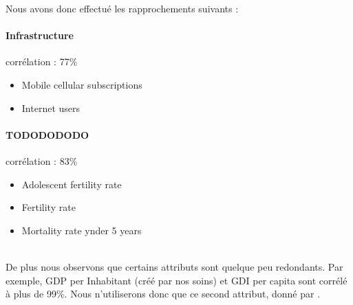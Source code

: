 Nous avons donc effectué les rapprochements suivants : 
\paragraph{Infrastructure} corrélation : 77\%
		\begin{itemize}
			\item Mobile cellular subscriptions
			\item Internet users
		\end{itemize}
\paragraph{TODODODODO} corrélation : 83\%
		\begin{itemize}
			\item Adolescent fertility rate
			\item Fertility rate
			\item Mortality rate ynder 5 years
		\end{itemize}
\hfill\\

De plus nous observons que certains attributs sont quelque peu redondants. Par exemple, GDP per Inhabitant (créé par nos soins) et GDI per capita sont corrélé à plus de 99\%. Nous n'utiliserons donc que ce second attribut, donné par \lesite .



